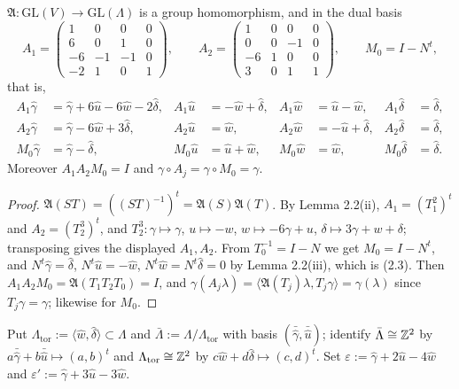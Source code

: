 \begin{lemma}
$\mathfrak A \colon \mathrm{GL}(V) \to \mathrm{GL}(\Lambda)$ is a group homomorphism, and in the dual basis
\[
A_1 = \begin{pmatrix} 1 & 0 & 0 & 0 \\ 6 & 0 & 1 & 0 \\ -6 & -1 & -1 & 0 \\ -2 & 1 & 0 & 1 \end{pmatrix}, \qquad
A_2 = \begin{pmatrix} 1 & 0 & 0 & 0 \\ 0 & 0 & -1 & 0 \\ -6 & 1 & 0 & 0 \\ 3 & 0 & 1 & 1 \end{pmatrix}, \qquad
M_0 = I - N^t,
\]
that is,
\begin{equation}
\begin{aligned}
A_1\hat\gamma &= \hat\gamma+6\hat u-6\hat w-2\hat\delta, & A_1\hat u &= -\hat w+\hat\delta, & A_1\hat w &= \hat u-\hat w, & A_1\hat\delta &= \hat\delta, \\
A_2\hat\gamma &= \hat\gamma-6\hat w+3\hat\delta, & A_2\hat u &= \hat w, & A_2\hat w &= -\hat u+\hat\delta, & A_2\hat\delta &= \hat\delta, \\
M_0\hat\gamma &= \hat\gamma-\hat\delta, & M_0\hat u &= \hat u+\hat w, & M_0\hat w &= \hat w, & M_0\hat\delta &= \hat\delta.
\end{aligned} \tag{2.3}
\end{equation}
Moreover $A_1A_2M_0 = I$ and $\gamma\circ A_j = \gamma \circ M_0 = \gamma$.
\end{lemma}

\begin{proof}
$\mathfrak A(ST) = ((ST)^{-1})^t = \mathfrak A(S)\mathfrak A(T)$. By Lemma 2.2(ii), $A_1 = (T_1^2)^t$ and $A_2 = (T_2^3)^t$, and $T_2^3\colon \gamma\mapsto\gamma$, $u\mapsto -w$, $w\mapsto -6\gamma+u$, $\delta\mapsto 3\gamma+w+\delta$; transposing gives the displayed $A_1, A_2$. From $T_0^{-1} = I-N$ we get $M_0 = I-N^t$, and $N^t\hat\gamma = \hat\delta$, $N^t\hat u = -\hat w$, $N^t\hat w = N^t\hat\delta = 0$ by Lemma 2.2(iii), which is (2.3). Then $A_1A_2M_0 = \mathfrak A(T_1T_2T_0) = I$, and $\gamma(A_j\lambda) = \langle \mathfrak A(T_j)\lambda, T_j\gamma\rangle = \gamma(\lambda)$ since $T_j\gamma = \gamma$; likewise for $M_0$.
\end{proof}

\begin{definition}
Put $\Lambda_{\mathrm{tor}} := \langle \hat w,\hat\delta\rangle \subset \Lambda$ and $\bar\Lambda := \Lambda/\Lambda_{\mathrm{tor}}$ with basis $(\bar{\hat\gamma},\bar{\hat u})$; identify $\bar\Lambda \cong \mathbb{Z}^2$ by $a\bar{\hat\gamma}+b\bar{\hat u} \mapsto (a,b)^t$ and $\Lambda_{\mathrm{tor}} \cong \mathbb{Z}^2$ by $c\hat w+d\hat\delta \mapsto (c,d)^t$. Set $\varepsilon := \hat\gamma+2\hat u-4\hat w$ and $\varepsilon' := \hat\gamma+3\hat u-3\hat w$.
\end{definition}


